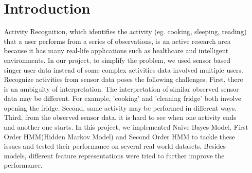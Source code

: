 \documentclass[10pt,letter]{article}
\numberwithin{equation}{section} %
\numberwithin{figure}{section} %
\numberwithin{table}{section} %
\begin{document}
\section{Introduction}
Activity Recognition, which identifies the activity (eg. cooking, sleeping, reading) that a user performs from a series of observations, is an active research area because it has many real-life applications such as healthcare and intelligent environments. In our project, to simplify the problem, we used sensor based singer user data instead of some complex activities data involved multiple users. Recognize activities from sensor data poses the following challenges. First, there is an ambiguity of interpretation. The interpretation of similar observed sensor data may be different. For example, 'cooking' and 'cleaning fridge' both involve opening the fridge. Second, same activity may be performed in different ways. Third, from the observed sensor data, it is hard to see when one activity ends and another one starts. In this project, we implemented Naive Bayes Model, First Order HMM(Hidden Markov Model) and Second Order HMM to tackle these issues and tested their performance on several real world datasets. Besides models, different feature representations were tried to further improve the performance. 
\end{document}
